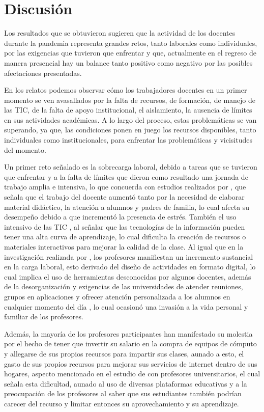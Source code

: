 \documentclass[spanish]{textolivre}
\begin{document}
\section{Discusión}

Los resultados que se obtuvieron sugieren que la actividad de los docentes durante la pandemia representa grandes retos, tanto laborales como individuales, por las exigencias que tuvieron que enfrentar y que, actualmente en el regreso de manera presencial hay un balance tanto positivo como negativo por las posibles afectaciones presentadas.

En los relatos podemos observar cómo los trabajadores docentes en un primer momento se ven avasallados por la falta de recursos, de formación, de manejo de las TIC, de la falta de apoyo institucional, el aislamiento, la ausencia de límites en sus actividades académicas. A lo largo del proceso, estas problemáticas se van superando, ya que, las condiciones ponen en juego los recursos disponibles, tanto individuales como institucionales, para enfrentar las problemáticas y vicisitudes del momento.

Un primer reto señalado es la sobrecarga laboral, debido a tareas que se tuvieron que enfrentar y a la falta de límites que dieron como resultado una jornada de trabajo amplia e intensiva, lo que concuerda con estudios realizados por \textcite{godoy2022carga}, que señala que el trabajo del docente aumentó tanto por la necesidad de elaborar material didáctico, la atención a alumnos y padres de familia, lo cual afecta su desempeño debido a que incrementó la presencia de estrés. También el uso intensivo de las TIC \cite{mendoza_castillo_lo_2020}, al señalar que las tecnologías de la información pueden tener una alta curva de aprendizaje, lo cual dificulta la creación de recursos o materiales interactivos para mejorar la calidad de la clase. Al igual que en la investigación realizada por \textcite{galvis_lopez_tensiones_2021}, los profesores manifiestan un incremento sustancial en la carga laboral, esto derivado del diseño de actividades en formato digital, lo cual implica el uso de herramientas desconocidas por algunos docentes, además de la desorganización y exigencias de las universidades de atender reuniones, grupos en aplicaciones y ofrecer atención personalizada a los alumnos en cualquier momento del día \cite{cortes2021teacher}, lo cual ocasionó una invasión a la vida personal y familiar de los profesores.

Además, la mayoría de los profesores participantes han manifestado su molestia por el hecho de tener que invertir su salario en la compra de equipos de cómputo y allegarse de sus propios recursos para impartir sus clases, aunado a esto, el gasto de sus propios recursos para mejorar sus servicios de internet dentro de sus hogares, aspecto mencionado en el estudio de \textcite{sanchez_mendiola_retos_2020} con profesores universitarios, el cual señala esta dificultad, aunado al uso de diversas plataformas educativas y a la preocupación de los profesores al saber que sus estudiantes también podrían carecer del recurso y limitar entonces su aprovechamiento y su aprendizaje.
\end{document}
